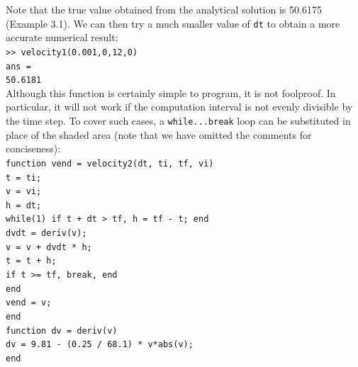 \documentclass[../main.tex]{subfiles}
\begin{document}
Note that the true value obtained from the analytical solution is 50.6175 (Example
3.1). We can then try a much smaller value of \texttt{dt} to obtain a more accurate numerical
result:\\

\texttt{>> velocity1(0.001,0,12,0)\\
\indent ans =\\
\indent\hspace{2mm} 50.6181}\\

Although this function is certainly simple to program, it is not foolproof. In particular,
it will not work if the computation interval is not evenly divisible by the time step.
To cover such cases, a \texttt{while...break} loop can be substituted in place of the
shaded area (note that we have omitted the comments for conciseness):\\

\texttt{function vend = velocity2(dt, ti, tf, vi)\\
\indent t = ti;\\
\indent v = vi;\\
\indent h = dt;\\
\indent while(1)
\indent \hspace{2mm}if t + dt > tf, h = tf - t; end\\
\indent \hspace{2mm}dvdt = deriv(v);\\
\indent \hspace{2mm}v = v + dvdt * h;\\
\indent \hspace{2mm}t = t + h;\\
\indent \hspace{2mm}if t >= tf, break, end\\
\indent end\\
\indent vend = v;\\
\indent end\\
\indent function dv = deriv(v)\\
\indent dv = 9.81 - (0.25 / 68.1) * v*abs(v);\\
\indent end}\\
\end{document}
